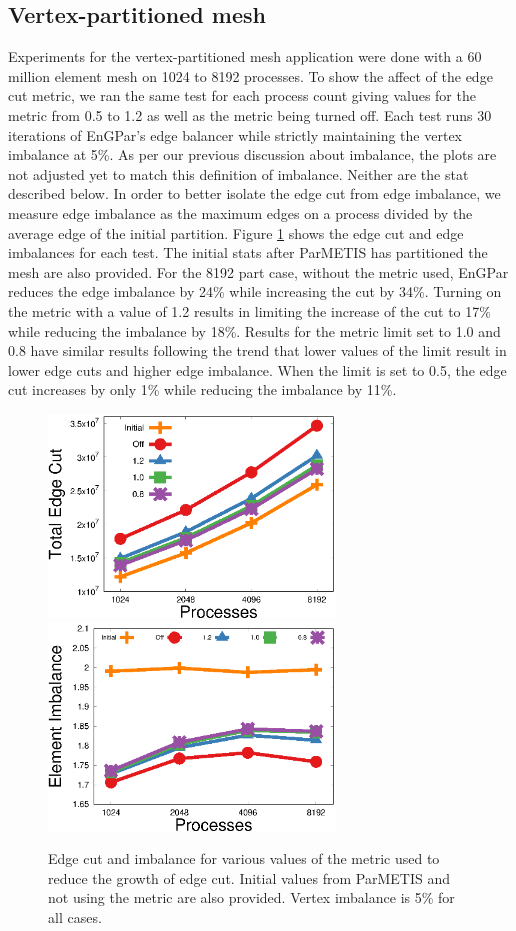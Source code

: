 \documentclass[conference]{IEEEtran}
\begin{document}
\subsection {Vertex-partitioned mesh}
Experiments for the vertex-partitioned mesh application were done with a 60 million
element mesh on 1024 to 8192 processes. To show the affect of the edge cut
metric, we ran the same test for each process count giving values for the metric
from 0.5 to 1.2 as well as the metric being turned off. Each test runs 30 iterations
of EnGPar's edge balancer while strictly maintaining the vertex imbalance at 5\%.
{\color{red} As per our previous discussion about imbalance, the plots are not adjusted yet to
  match this definition of imbalance. Neither are the stat described below.}
In order to better isolate the edge cut from edge imbalance, we measure edge imbalance as the
maximum edges on a process divided by the average edge of the initial partition.
Figure \ref{fig:metric} shows the edge cut and edge imbalances for each
test. The initial stats after ParMETIS has partitioned the mesh are also provided. For the
8192 part case, without
the metric used, EnGPar reduces the edge imbalance by 24\% while increasing the cut by
34\%. Turning on the metric with a value of 1.2 results in limiting the increase of the cut to
17\% while reducing the imbalance by 18\%. Results for the metric limit set to 1.0
and 0.8 have similar results following the trend that lower values of the limit result
in lower edge cuts and higher edge imbalance. When the limit is set to 0.5, the edge cut
increases by only 1\% while reducing the imbalance by 11\%.

\begin{figure}[!ht]
  \centering
  \includegraphics[width=3in]{plots/aepw_edgeCut_collapse_results/ecut_v_cores}
  \includegraphics[width=3in]{plots/aepw_edgeCut_collapse_results/eimb_v_cores}
  \caption{Edge cut and imbalance for various values of the metric used to reduce the growth of edge cut. Initial values from ParMETIS and not using the metric are also provided. Vertex imbalance is 5\% for all cases.}
  \label{fig:metric}
\end{figure}
\end{document}
